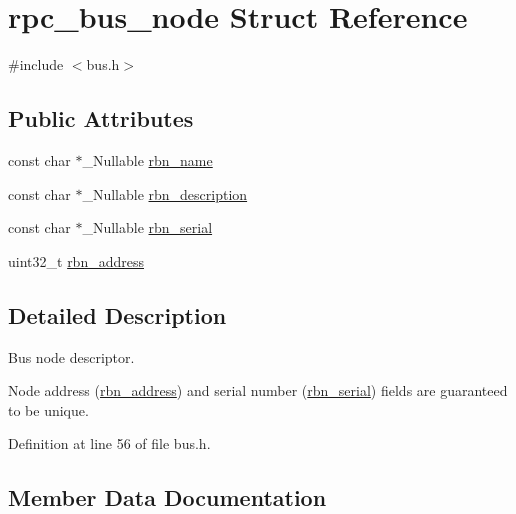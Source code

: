 \hypertarget{structrpc__bus__node}{}\section{rpc\+\_\+bus\+\_\+node Struct Reference}
\label{structrpc__bus__node}


{\ttfamily \#include $<$bus.\+h$>$}

\subsection*{Public Attributes}
\begin{DoxyCompactItemize}
\item 
const char $\ast$\+\_\+\+Nullable \hyperlink{structrpc__bus__node_a9afbf9a155ae01c1c47dc210a8334022}{rbn\+\_\+name}
\item 
const char $\ast$\+\_\+\+Nullable \hyperlink{structrpc__bus__node_af5d23beee7c50520e7235f0c922fafb1}{rbn\+\_\+description}
\item 
const char $\ast$\+\_\+\+Nullable \hyperlink{structrpc__bus__node_a885b358a61a0b459d86d7c534be6ef0f}{rbn\+\_\+serial}
\item 
uint32\+\_\+t \hyperlink{structrpc__bus__node_a624e2a0be665938924ab2f815afb669e}{rbn\+\_\+address}
\end{DoxyCompactItemize}


\subsection{Detailed Description}
Bus node descriptor.

Node address (\hyperlink{structrpc__bus__node_a624e2a0be665938924ab2f815afb669e}{rbn\+\_\+address}) and serial number (\hyperlink{structrpc__bus__node_a885b358a61a0b459d86d7c534be6ef0f}{rbn\+\_\+serial}) fields are guaranteed to be unique. 

Definition at line 56 of file bus.\+h.



\subsection{Member Data Documentation}
\mbox{\label{structrpc__bus__node_a624e2a0be665938924ab2f815afb669e}} 

